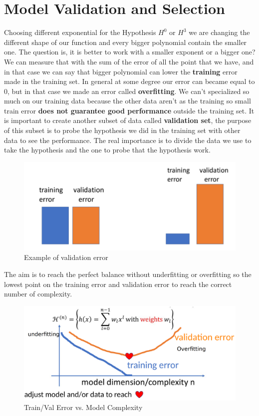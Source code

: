 \chapter{Model Validation and Selection}

Choosing different exponential for the Hypothesis $H^0$ or $H^3$ we are changing the different shape of our function and every bigger polynomial contain the smaller one.
The question is, it is better to work with a smaller exponent or a bigger one? We can measure that with the sum of the error of all the point that we have, and in that case we can say that bigger polynomial can lower the \textbf{training} error made in the training set. In general at some degree our error can became equal to 0, but in that case we made an error called \textbf{overfitting}.
We can't specialized so much on our training data because the other data aren't as the training so small train error \textbf{does not guarantee good performance} outside the training set.
It is important to create another subset of data called \textbf{validation set}, the purpose of this subset is to probe the hypothesis we did in the training set with other data to see the performance.
The real importance is to divide the data we use to take the hypothesis and the  one to probe that the hypothesis work.

\begin{figure}[H]
    \centering
    \includegraphics[scale=0.4]{images/MVS/MVS1.png}
    \caption{Example of validation error}
    \label{fig:enter-label}
\end{figure}

The aim is to reach the perfect balance without underfitting or overfitting so the lowest point on the training error and validation error to reach the correct number of complexity.
\begin{figure}[H]
    \centering
    \includegraphics[scale=0.25]{images/MVS/MVS2.png}
    \caption{Train/Val Error vs. Model Complexity}
    \label{fig:enter-label}
\end{figure}

